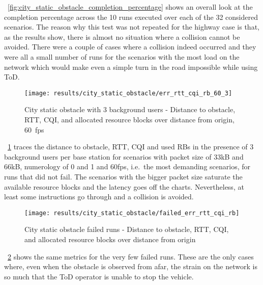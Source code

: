 \figurename~\ref{fig:city_static_obstacle_completion_percentage} shows an overall look at the completion percentage across the 10 runs executed over each of the 32 considered scenarios.
The reason why this test was not repeated for the highway case is that, as the results show, there is almost no situation where a collision cannot be avoided. There were a couple of cases where a collision indeed occurred and they were all a small number of runs for the scenarios with the most load on the network which would make even a simple turn in the road impossible while using ToD.

\begin{figure}[H]
    \centering
    \texttt{[image: results/city\_static\_obstacle/err\_rtt\_cqi\_rb\_60\_3]}
    \caption{City static obstacle with 3 background users - Distance to obstacle, RTT, CQI, and allocated resource blocks over distance from origin, 60~fps}
    \label{fig:city_static_obstacle_err_rtt_cqi_rb_60_3}
\end{figure}

\figurename~\ref{fig:city_static_obstacle_err_rtt_cqi_rb_60_3} traces the distance to obstacle, RTT, CQI and used RBs in the presence of 3 background users per base station for scenarios with packet size of 33kB and 66kB, numerology of 0 and 1 and 60fps, i.e.\ the most demanding scenarios, for runs that did not fail. The scenarios with the bigger packet size saturate the available resource blocks and the latency goes off the charts. Nevertheless, at least some instructions go through and a collision is avoided.

\begin{figure}[H]
    \centering
    \texttt{[image: results/city\_static\_obstacle/failed\_err\_rtt\_cqi\_rb]}
    \caption{City static obstacle failed runs - Distance to obstacle, RTT, CQI, and allocated resource blocks over distance from origin}

    \label{fig:city_static_obstacle_failed_err_rtt_cqi_rb}
\end{figure}

\figurename~\ref{fig:city_static_obstacle_failed_err_rtt_cqi_rb} shows the same metrics for the very few failed runs. These are the only cases where, even when the obstacle is observed from afar, the strain on the network is so much that the ToD operator is unable to stop the vehicle.




